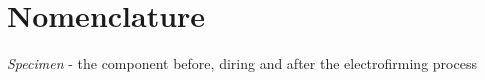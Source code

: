 \chapter{Nomenclature}

\textit{Specimen} - the component before, diring and after the electrofirming process
\textit{}
